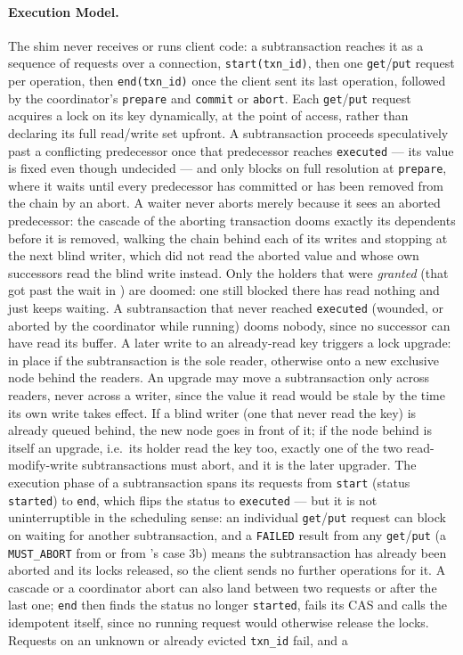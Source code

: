 \documentclass{article}
\begin{document}
\paragraph{Execution Model.}
The shim never receives or runs client code: a subtransaction reaches it as a sequence of requests over a connection, \texttt{start(txn\_id)}, then one \texttt{get}/\texttt{put} request per operation, then \texttt{end(txn\_id)} once the client sent its last operation, followed by the coordinator's \texttt{prepare} and \texttt{commit} or \texttt{abort}. Each \texttt{get}/\texttt{put} request acquires a lock on its key dynamically, at the point of access, rather than declaring its full read/write set upfront. A subtransaction proceeds speculatively past a conflicting predecessor once that predecessor reaches \texttt{executed} --- its value is fixed even though undecided --- and only blocks on full resolution at \texttt{prepare}, where it waits until every predecessor has committed or has been removed from the chain by an abort. A waiter never aborts merely because it sees an aborted predecessor: the cascade of the aborting transaction dooms exactly its dependents before it is removed, walking the chain behind each of its writes and stopping at the next blind writer, which did not read the aborted value and whose own successors read the blind write instead. Only the holders that were \emph{granted} (that got past the wait in ) are doomed: one still blocked there has read nothing and just keeps waiting. A subtransaction that never reached \texttt{executed} (wounded, or aborted by the coordinator while running) dooms nobody, since no successor can have read its buffer. A later write to an already-read key triggers a lock upgrade: in place if the subtransaction is the sole reader, otherwise onto a new exclusive node behind the readers. An upgrade may move a subtransaction only across readers, never across a writer, since the value it read would be stale by the time its own write takes effect. If a blind writer (one that never read the key) is already queued behind, the new node goes in front of it; if the node behind is itself an upgrade, i.e.\ its holder read the key too, exactly one of the two read-modify-write subtransactions must abort, and it is the later upgrader. The execution phase of a subtransaction spans its requests from \texttt{start} (status \texttt{started}) to \texttt{end}, which flips the status to \texttt{executed} --- but it is not uninterruptible in the scheduling sense: an individual \texttt{get}/\texttt{put} request can block on  waiting for another subtransaction, and a \texttt{FAILED} result from any \texttt{get}/\texttt{put} (a \texttt{MUST\_ABORT} from  or from 's case 3b) means the subtransaction has already been aborted and its locks released, so the client sends no further operations for it. A cascade or a coordinator abort can also land between two requests or after the last one; \texttt{end} then finds the status no longer \texttt{started}, fails its CAS and calls the idempotent  itself, since no running request would otherwise release the locks. Requests on an unknown or already evicted \texttt{txn\_id} fail, and a 
\end{document}
